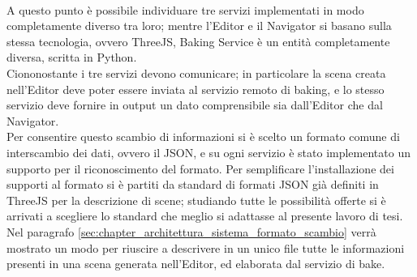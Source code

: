 \\  
A questo punto è possibile individuare tre servizi implementati in modo completamente diverso tra loro; mentre l’Editor e il Navigator si basano sulla stessa tecnologia, ovvero ThreeJS, Baking Service è un entità completamente diversa, scritta in Python. 
\\
Ciononostante i tre servizi devono comunicare; in particolare la scena creata nell’Editor deve poter essere inviata al servizio remoto di baking, e lo stesso servizio deve fornire in output un dato comprensibile sia dall’Editor che dal Navigator. 
\\
Per consentire questo scambio di informazioni si è scelto un formato comune di interscambio dei dati, ovvero il JSON, e su ogni servizio è stato implementato un supporto per il riconoscimento del formato. Per semplificare l’installazione dei supporti al formato si è partiti da standard di formati JSON già definiti in ThreeJS per la descrizione di scene; studiando tutte le possibilità offerte si è arrivati a scegliere lo standard che meglio si adattasse al presente lavoro di tesi. 
\\
Nel paragrafo \ref{sec:chapter_architettura_sistema_formato_scambio} verrà mostrato un modo per riuscire a descrivere in un unico file tutte le informazioni presenti in una scena generata nell’Editor, ed elaborata dal servizio di bake.